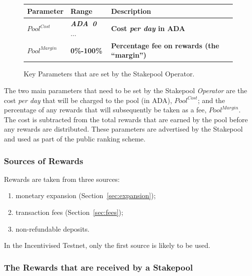 \documentclass[11pt,a4paper,dvipsnames,twosided,final]{article}
\newcommand{\ada}{ADA{}}
\newcommand{\ADA}[1]{\textbf{\emph{\ada~{#1}}}}
\begin{document}
\begin{figure}[h!]
\begin{center}
\begin{tabular}{||l|l|p{9cm}||}
  \hline \hline
\textbf{Parameter} & \textbf{Range} & \textbf{Description} \\\hline
       \textbf{\color{red} $\textit{Pool}^{\textit{Cost}}$} &  \textbf{\color{red}  \ADA{0} $\ldots$} & \textbf{\color{red} Cost
         \emph{per day} in \ada{}} \\\hline
\textbf{\color{red} ${\textit{Pool}}^{\textit{Margin}}$} &  \textbf{\color{red} 0\%-100\%} & \textbf{\color{red} Percentage fee on rewards (the ``margin'')} \\\hline
  \hline
\end{tabular}
\end{center}
\caption{Key Parameters that are set by the Stakepool Operator.}
\end{figure}

\noindent
The two main parameters that need to be set by the Stakepool \emph{Operator} are the cost \emph{per day} that will be charged to
the pool (in \ada), $\textit{Pool}^{\textit{Cost}}$; and the percentage of any rewards that will subsequently be taken as a fee, ${\textit{Pool}}^{\textit{Margin}}$.
The cost is subtracted from the total rewards that are earned by the pool before any rewards are distributed.
These parameters are advertised by the Stakepool and used as part of the public ranking scheme.

\subsubsection*{Sources of Rewards}

Rewards are taken from three sources:

\begin{enumerate}
\item
  monetary expansion (Section~\ref{sec:expansion});
\item
  transaction fees (Section~\ref{sec:fees});
\item
  non-refundable deposits.
\end{enumerate}

\noindent
In the Incentivised Testnet, only the first source is likely to be used.

\subsubsection*{The Rewards that are received by a Stakepool}
\end{document}
